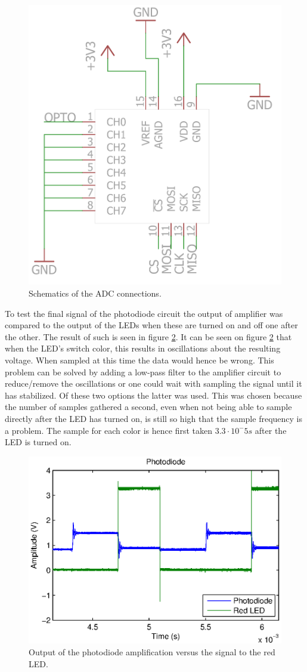 \begin{figure}[H]
\centering 
\includegraphics[width = 0.4 \textwidth]{images/ADC_schematics}
\caption{Schematics of the ADC connections.}
\label{fig:adc_schematics}
\end{figure}


To test the final signal of the photodiode circuit the output of amplifier was compared to the output of the LEDs when these are turned on and off one after the other.
The result of such is seen in figure \ref{fig:photodiode_output}.
It can be seen on figure \ref{fig:photodiode_output} that when the LED's switch color, this results in oscillations about the resulting voltage.
When sampled at this time the data would hence be wrong.
This problem can be solved by adding a low-pass filter to the amplifier circuit to reduce/remove the oscillations or one could wait with sampling the signal until it has stabilized.
Of these two options the latter was used.
This was chosen because the number of samples gathered a second, even when not being able to sample directly after the LED has turned on, is still so high that the sample frequency is a problem.
The sample for each color is hence first taken $3.3 \cdot 10^-5 s$ after the LED is turned on.


\begin{figure}[H]
\centering 
\includegraphics[width = 0.9 \textwidth]{images/photodiode}
\caption{Output of the photodiode amplification versus the signal to the red LED.}
\label{fig:photodiode_output}
\end{figure}

